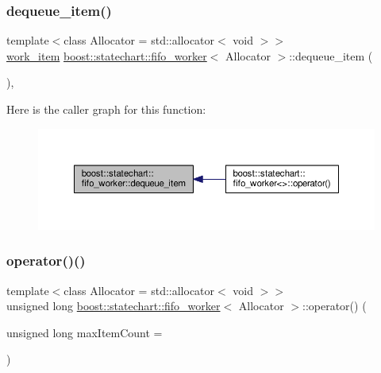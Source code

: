 \subsubsection{\texorpdfstring{dequeue\+\_\+item()}{dequeue\_item()}}
{\footnotesize\ttfamily template$<$class Allocator = std\+::allocator$<$ void $>$$>$ \\
\mbox{\hyperlink{classboost_1_1statechart_1_1fifo__worker_ac90f6805565bb3e8d65e4cdde96d90c2}{work\+\_\+item}} \mbox{\hyperlink{classboost_1_1statechart_1_1fifo__worker}{boost\+::statechart\+::fifo\+\_\+worker}}$<$ Allocator $>$\+::dequeue\+\_\+item (\begin{DoxyParamCaption}{ }\end{DoxyParamCaption})\hspace{0.3cm}{\ttfamily [inline]}, {\ttfamily [private]}}

Here is the caller graph for this function\+:
\nopagebreak
\begin{figure}[H]
\begin{center}
\leavevmode
\includegraphics[width=350pt]{classboost_1_1statechart_1_1fifo__worker_a63316cebc1a5e703b5e4765b577addfa_icgraph}
\end{center}
\end{figure}
\mbox{\label{classboost_1_1statechart_1_1fifo__worker_a5b3bed56e4cef74649ab1f3b389600d7}} 
\subsubsection{\texorpdfstring{operator()()}{operator()()}}
{\footnotesize\ttfamily template$<$class Allocator = std\+::allocator$<$ void $>$$>$ \\
unsigned long \mbox{\hyperlink{classboost_1_1statechart_1_1fifo__worker}{boost\+::statechart\+::fifo\+\_\+worker}}$<$ Allocator $>$\+::operator() (\begin{DoxyParamCaption}\item[{unsigned long}]{max\+Item\+Count = {} }\end{DoxyParamCaption})\hspace{0.3cm}{\ttfamily [inline]}}


